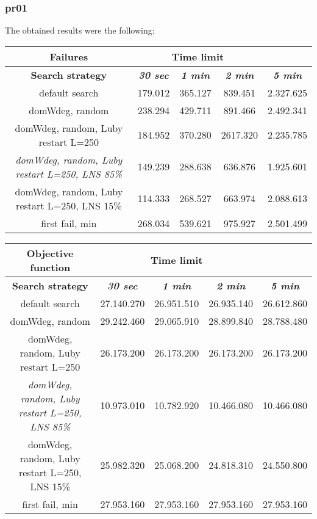 \subsubsection{pr01}
The obtained results were the following:
{
\renewcommand{\arraystretch}{2}
\begin{longtable}[h]{| c | c | c | c | c |}
    \hline
    \textbf{Failures} & \multicolumn{3}{c}{Time limit} & \\
    \hline
    \textbf{Search strategy} & \textbf{\textit{30 sec}} & \textbf{\textit{1 min}} & \textbf{\textit{2 min}} & \textbf{\textit{5 min}} \\
    \hline
    \endhead
    default search                                         & 179.012 & 365.127 &  839.451 & 2.327.625 \\
    \hline
    domWdeg, random                                        & 238.294 & 429.711 &  891.466 & 2.492.341 \\
    \hline
    domWdeg, random, Luby restart L=250                    & 184.952 & 370.280 & 2617.320 & 2.235.785 \\
    \hline
    \textit{domWdeg, random, Luby restart L=250, LNS 85\%} & 149.239 & 288.638 &  636.876 & 1.925.601 \\
    \hline
    domWdeg, random, Luby restart L=250, LNS 15\%          & 114.333 & 268.527 &  663.974 & 2.088.613 \\
    \hline
    first fail, min                                        & 268.034 & 539.621 &  975.927 & 2.501.499 \\
    \hline
\end{longtable}
}

{
\renewcommand{\arraystretch}{2}
\begin{longtable}[h]{| c | c | c | c | c |}
    \hline
    \textbf{Objective function} & \multicolumn{3}{c}{Time limit} & \\
    \hline
    \textbf{Search strategy} & \textbf{\textit{30 sec}} & \textbf{\textit{1 min}} & \textbf{\textit{2 min}} & \textbf{\textit{5 min}} \\
    \hline
    \endhead
    default search                                         & 27.140.270 & 26.951.510 & 26.935.140 & 26.612.860 \\
    \hline
    domWdeg, random                                        & 29.242.460 & 29.065.910 & 28.899.840 & 28.788.480 \\
    \hline
    domWdeg, random, Luby restart L=250                    & 26.173.200 & 26.173.200 & 26.173.200 & 26.173.200 \\
    \hline
    \textit{domWdeg, random, Luby restart L=250, LNS 85\%} & 10.973.010 & 10.782.920 & 10.466.080 & 10.466.080 \\
    \hline
    domWdeg, random, Luby restart L=250, LNS 15\%          & 25.982.320 & 25.068.200 & 24.818.310 & 24.550.800 \\
    \hline
    first fail, min                                        & 27.953.160 & 27.953.160 & 27.953.160 & 27.953.160 \\
    \hline
\end{longtable}
}
